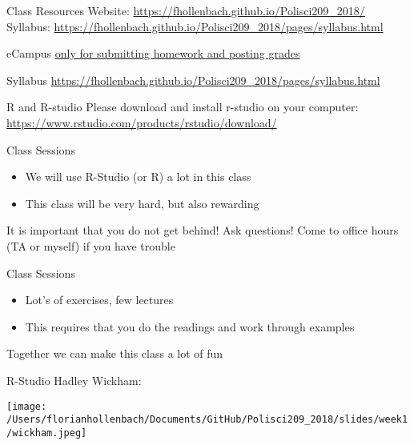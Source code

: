 \documentclass[presentation]{beamer}
\begin{document}
\begin{frame}[label={sec:orgc82d57d}]{Class Resources}
Website: \url{https://fhollenbach.github.io/Polisci209\_2018/}
Syllabus: \url{https://fhollenbach.github.io/Polisci209\_2018/pages/syllabus.html}

eCampus \uline{\uline{only for submitting homework and posting grades}}
\end{frame}

\begin{frame}[label={sec:orgdc128fa}]{Syllabus}
\url{https://fhollenbach.github.io/Polisci209\_2018/pages/syllabus.html}
\end{frame}


\begin{frame}[label={sec:orgfbd50f4}]{R and R-studio}
Please download and install r-studio on your computer:
\url{https://www.rstudio.com/products/rstudio/download/}
\end{frame}

\begin{frame}[label={sec:org7dcdcbc}]{Class Sessions}
\begin{itemize}
\item We will use R-Studio (or R) a lot in this class
\item This class will be very hard, but also rewarding
\end{itemize}

\begin{alertblock}{It is important that you do not get behind!}
Ask questions! Come to office hours (TA or myself) if you have trouble
\end{alertblock}
\end{frame}

\begin{frame}[label={sec:org14b6ff0}]{Class Sessions}
\begin{itemize}
\item Lot's of exercises, few lectures
\item This requires that you do the readings and work through examples
\end{itemize}

\begin{alertblock}{Together we can make this class a lot of fun}
\end{alertblock}
\end{frame}


\begin{frame}[label={sec:org1d735cc}]{R-Studio}
Hadley Wickham:
\begin{center}
\texttt{[image: /Users/florianhollenbach/Documents/GitHub/Polisci209\_2018/slides/week1/wickham.jpeg]}
\end{center}
\end{frame}
\end{document}
